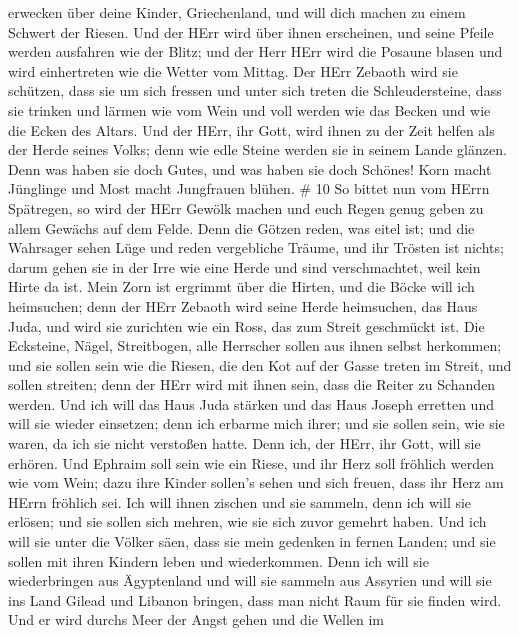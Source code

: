 erwecken über deine Kinder, Griechenland, und will dich machen zu einem
Schwert der Riesen.  Und der HErr wird über ihnen
erscheinen, und seine Pfeile werden ausfahren wie der Blitz; und der
Herr HErr wird die Posaune blasen und wird einhertreten wie die Wetter
vom Mittag.  Der HErr Zebaoth wird sie schützen, dass sie
um sich fressen und unter sich treten die Schleudersteine, dass sie
trinken und lärmen wie vom Wein und voll werden wie das Becken und wie
die Ecken des Altars.  Und der HErr, ihr Gott, wird ihnen
zu der Zeit helfen als der Herde seines Volks; denn wie edle Steine
werden sie in seinem Lande glänzen.  Denn was haben sie
doch Gutes, und was haben sie doch Schönes! Korn macht Jünglinge und
Most macht Jungfrauen blühen. \# 10  So bittet nun vom HErrn
Spätregen, so wird der HErr Gewölk machen und euch Regen genug geben zu
allem Gewächs auf dem Felde.  Denn die Götzen reden, was
eitel ist; und die Wahrsager sehen Lüge und reden vergebliche Träume,
und ihr Trösten ist nichts; darum gehen sie in der Irre wie eine Herde
und sind verschmachtet, weil kein Hirte da ist.  Mein Zorn
ist ergrimmt über die Hirten, und die Böcke will ich heimsuchen; denn
der HErr Zebaoth wird seine Herde heimsuchen, das Haus Juda, und wird
sie zurichten wie ein Ross, das zum Streit geschmückt ist. 
Die Ecksteine, Nägel, Streitbogen, alle Herrscher sollen aus ihnen
selbst herkommen;  und sie sollen sein wie die Riesen, die
den Kot auf der Gasse treten im Streit, und sollen streiten; denn der
HErr wird mit ihnen sein, dass die Reiter zu Schanden werden.
 Und ich will das Haus Juda stärken und das Haus Joseph
erretten und will sie wieder einsetzen; denn ich erbarme mich ihrer; und
sie sollen sein, wie sie waren, da ich sie nicht verstoßen hatte. Denn
ich, der HErr, ihr Gott, will sie erhören.  Und Ephraim soll
sein wie ein Riese, und ihr Herz soll fröhlich werden wie vom Wein; dazu
ihre Kinder sollen's sehen und sich freuen, dass ihr Herz am HErrn
fröhlich sei.  Ich will ihnen zischen und sie sammeln, denn
ich will sie erlösen; und sie sollen sich mehren, wie sie sich zuvor
gemehrt haben.  Und ich will sie unter die Völker säen, dass
sie mein gedenken in fernen Landen; und sie sollen mit ihren Kindern
leben und wiederkommen.  Denn ich will sie wiederbringen
aus Ägyptenland und will sie sammeln aus Assyrien und will sie ins Land
Gilead und Libanon bringen, dass man nicht Raum für sie finden wird.
 Und er wird durchs Meer der Angst gehen und die Wellen im
